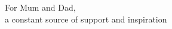 \begin{dedication}
    For Mum and Dad,\\a constant source of support and inspiration
\end{dedication}
